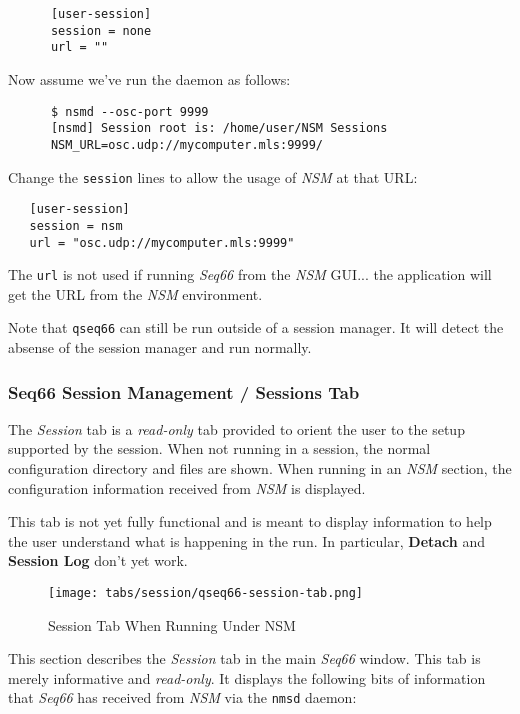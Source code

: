    \begin{verbatim}
      [user-session]
      session = none
      url = ""
   \end{verbatim}

   Now assume we've run the daemon as follows:

   \begin{verbatim}
      $ nsmd --osc-port 9999
      [nsmd] Session root is: /home/user/NSM Sessions
      NSM_URL=osc.udp://mycomputer.mls:9999/
   \end{verbatim}

   Change the \texttt{session} lines to allow the usage of
   \textsl{NSM} at that URL:

\begin{verbatim}
   [user-session]
   session = nsm
   url = "osc.udp://mycomputer.mls:9999"
\end{verbatim}

   The \texttt{url} is not used if running \textsl{Seq66} from the \textsl{NSM}
   GUI... the application will get the URL from the \textsl{NSM} environment.

   Note that \texttt{qseq66} can still be run outside of a
   session manager.  It will detect the absense of the session manager and run
   normally.

\subsubsection{Seq66 Session Management / Sessions Tab}
\label{subsubsec:sessions_tab}

   The \textsl{Session} tab is a \textsl{read-only} tab
   provided to orient the user to the setup supported by the session.
   When not running in a session, the normal configuration directory and files
   are shown.  When running in an \textsl{NSM} section, the configuration
   information received from \textsl{NSM} is displayed.

   This tab is not yet fully functional and is meant to display information to
   help the user understand what is happening in the run.  In particular,
   \textbf{Detach} and \textbf{Session Log} don't yet work.

\begin{figure}[H]
   \centering 
   \texttt{[image: tabs/session/qseq66-session-tab.png]}
   \caption*{Session Tab When Running Under NSM}
\end{figure}

   This section describes the \textsl{Session} tab in the main
   \textsl{Seq66} window.  This tab is merely informative and
   \textsl{read-only}.
   It displays the following bits of information that \textsl{Seq66} has received
   from \textsl{NSM} via the \texttt{nmsd} daemon:

